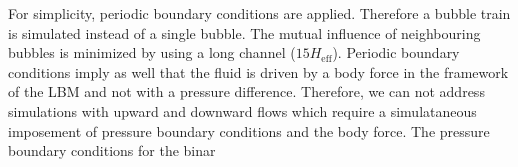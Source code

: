 \documentclass[preprint,12pt]{elsarticle}
\begin{document}
For simplicity, periodic boundary conditions are applied. Therefore  a bubble
train is simulated
instead of a single bubble.  The mutual influence of neighbouring bubbles is minimized
by using a long
channel ($15 H_{\mathrm{eff}}$). Periodic boundary conditions imply as well that the fluid is driven
by a
body force in the framework of the LBM and not with a pressure difference. Therefore, we can not
address simulations with upward and downward flows \cite{cerro-bubble-train} which require a
simulataneous imposement of pressure boundary conditions and the body force. The pressure boundary
conditions for the binar
\end{document}
